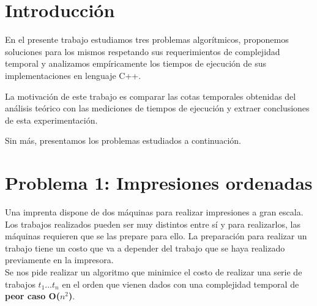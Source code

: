 \documentclass[a4paper, 10pt, twoside]{article}
\begin{document}
\newpage




\tableofcontents

\newpage




\section{Introducción}

En el presente trabajo estudiamos tres problemas algorítmicos, proponemos soluciones para los mismos respetando sus requerimientos de complejidad temporal y analizamos empíricamente los tiempos de ejecución de sus implementaciones en lenguaje C++.

La motivación de este trabajo es comparar las cotas temporales obtenidas del análisis teórico con las mediciones de tiempos de ejecución y extraer conclusiones de esta experimentación.

Sin más, presentamos los problemas estudiados a continuación.



\newpage

\section{Problema 1: Impresiones ordenadas}

Una imprenta dispone de dos máquinas para realizar impresiones a gran escala. Los trabajos realizados pueden ser muy distintos entre sí y para realizarlos, las máquinas requieren que se las prepare para ello. La preparación para realizar un trabajo tiene un costo que va a depender del trabajo que se haya realizado previamente en la impresora.\\

Se nos pide realizar un algoritmo que minimice el costo de realizar una serie de trabajos $t_1$...$t_n$ en el orden que vienen dados con una complejidad temporal de \textbf{peor caso O($n^2$)}.
\end{document}
